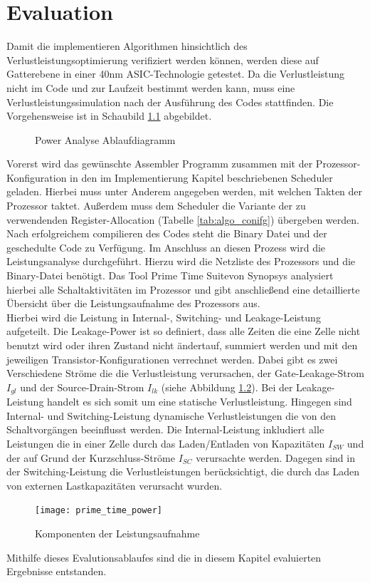\chapter{Evaluation}
\label{chap:evaluation} 
Damit die implementieren Algorithmen hinsichtlich des Verlustleistungsoptimierung verifiziert werden können, werden diese auf Gatterebene in einer 40nm ASIC-Technologie getestet. Da die Verlustleistung nicht im Code und zur Laufzeit bestimmt werden kann, muss eine Verlustleistungssimulation nach der Ausführung des Codes stattfinden. Die Vorgehensweise ist in Schaubild \ref{fig:flow_power_analyse} abgebildet.

\begin{scriptsize}
	\begin{figure}[htbp] 
		\centering
		
		\caption{Power Analyse Ablaufdiagramm}
		\label{fig:flow_power_analyse}
	\end{figure}
\end{scriptsize}

Vorerst wird das gewünschte Assembler Programm zusammen mit der Prozessor-Konfiguration in den im Implementierung Kapitel beschriebenen Scheduler geladen. Hierbei muss unter Anderem angegeben werden, mit welchen Takten der Prozessor taktet. Außerdem muss dem Scheduler die Variante der zu verwendenden Register-Allocation (Tabelle \ref{tab:algo_conifg}) übergeben werden. Nach erfolgreichem compilieren des Codes steht die Binary Datei und der geschedulte Code zu Verfügung. Im Anschluss an diesen Prozess wird die Leistungsanalyse durchgeführt. Hierzu wird die Netzliste des Prozessors und die Binary-Datei benötigt. Das Tool \glqq Prime Time Suite\grqq von Synopsys analysiert hierbei alle Schaltaktivitäten im Prozessor und gibt anschließend eine detaillierte Übersicht über die Leistungsaufnahme des Prozessors aus.\\
Hierbei wird die Leistung in Internal-, Switching- und Leakage-Leistung aufgeteilt. Die Leakage-Power ist so definiert, dass alle Zeiten die eine Zelle nicht benutzt wird oder ihren Zustand nicht ändertauf, summiert werden und mit den jeweiligen Transistor-Konfigurationen verrechnet werden. Dabei gibt es zwei Verschiedene Ströme die die Verlustleistung verursachen, der Gate-Leakage-Strom $I_{gl}$ und der Source-Drain-Strom $I_{lk}$ (siehe Abbildung \ref{fig:prime_time_power}).  Bei der Leakage-Leistung handelt es sich somit um eine statische Verlustleistung. Hingegen sind Internal- und Switching-Leistung dynamische Verlustleistungen die von den Schaltvorgängen beeinflusst werden. Die Internal-Leistung inkludiert alle Leistungen die in einer Zelle durch das Laden/Entladen von Kapazitäten $I_{SW}$ und der auf Grund der Kurzschluss-Ströme $I_{SC}$ verursachte werden. Dagegen sind in der Switching-Leistung die Verlustleistungen berücksichtigt, die durch das Laden von externen Lastkapazitäten verursacht wurden.\cite{primeTime2016}
\begin{figure}[H] 
	\centering
	\texttt{[image: prime\_time\_power]}
	\caption[Komponenten der Leistungsaufnahme]{Komponenten der Leistungsaufnahme \cite{primeTime2016}}
	\label{fig:prime_time_power}
\end{figure}
Mithilfe dieses Evalutionsablaufes sind die in diesem Kapitel evaluierten Ergebnisse entstanden.
